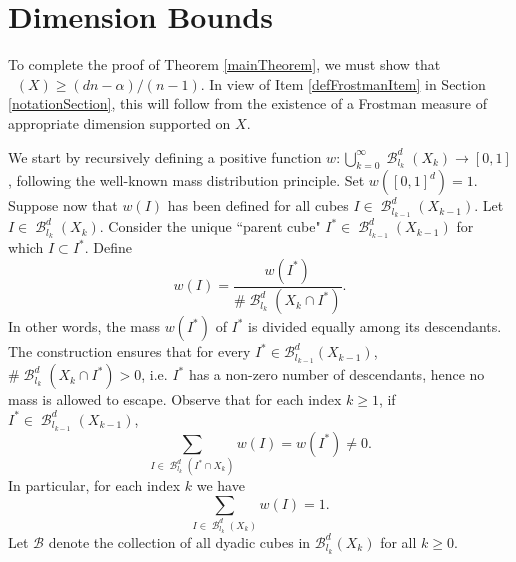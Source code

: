 \documentclass[dvipsnames,letterpaper,12pt]{article}
\numberwithin{equation}{section}
\theoremstyle{plain}
\theoremstyle{remark}
\DeclareMathOperator{\hausdim}{\dim_{\mathbf{H}}}
\DeclareMathOperator{\B}{\mathcal{B}}
\begin{document}
\section{Dimension Bounds}\label{dimensionsection}

To complete the proof of Theorem \ref{mainTheorem}, we must show that $\hausdim(X) \geq (dn - \alpha)/(n - 1)$. In view of Item \ref{defFrostmanItem} in Section \ref{notationSection}, this will follow from the existence of a Frostman measure of appropriate dimension supported on $X$. 

We start by recursively defining a positive function $w: \bigcup_{k = 0}^\infty \B^d_{l_k}(X_k) \to [0,1]$, following the well-known mass distribution principle. Set $w([0,1]^d) = 1$. Suppose now that $w(I)$ has been defined for all cubes $I \in \B^d_{l_{k-1}}(X_{k-1})$. Let $I \in \B^d_{l_k}(X_k)$. Consider the unique ``parent cube" $I^* \in \B^d_{l_{k-1}}(X_{k-1})$ for which $I \subset I^*$. Define
%
\begin{equation} \label{muRecurse}
	w(I) = \frac{w(I^*)}{\# \B^d_{l_k}(X_k \cap I^*)}.
\end{equation}
In other words, the mass $w(I^*)$ of $I^*$ is divided equally among its descendants. The construction ensures that for every $I^* \in \mathcal{B}_{l_{k-1}}^d(X_{k-1})$, $\# \B^d_{l_k}(X_k \cap I^*) > 0$, i.e. $I^*$ has a non-zero number of descendants, hence no mass is allowed to escape. Observe that for each index $k \geq 1$, if $I^* \in \B_{l_{k-1}}^d(X_{k-1})$, 
%
\begin{equation}\label{muBreakDown}
	\sum_{I \in \B_{l_k}^d(I^* \cap X_k)} w(I) = w(I^*) \ne 0.
\end{equation}
%
In particular, for each index $k$ we have
%
\[ \sum_{I \in \B_{l_k}^d(X_k)} w(I) = 1. \]
Let $\mathcal B$ denote the collection of all dyadic cubes in $\mathcal B_{l_k}^d(X_k)$ for all $k \geq 0$.
\end{document}
